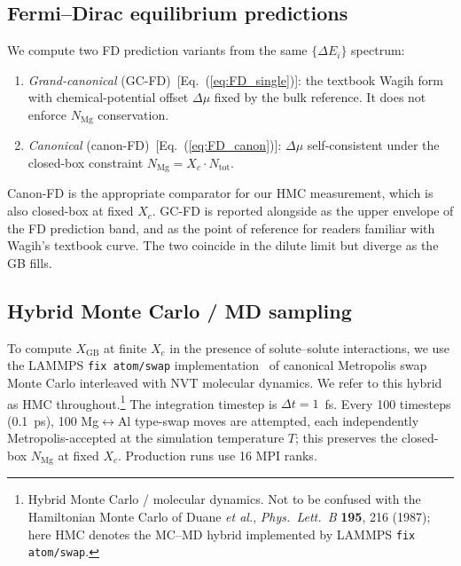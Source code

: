\subsection{Fermi--Dirac equilibrium predictions}\label{sec:meth:FD}

We compute two FD prediction variants from the same $\{\Delta E_i\}$
spectrum:
\begin{enumerate}\itemsep0pt
    \item \emph{Grand-canonical} (GC-FD)~[Eq.~(\ref{eq:FD_single})]: the
        textbook Wagih form with chemical-potential offset $\Delta\mu$
        fixed by the bulk reference. It does not enforce $N_\mathrm{Mg}$
        conservation.
    \item \emph{Canonical} (canon-FD)~[Eq.~(\ref{eq:FD_canon})]:
        $\Delta\mu$ self-consistent under the closed-box constraint
        $N_\mathrm{Mg} = X_c \cdot N_\mathrm{tot}$.
\end{enumerate}
Canon-FD is the appropriate comparator for our HMC measurement, which is
also closed-box at fixed $X_c$. GC-FD is reported alongside as the
upper envelope of the FD prediction band, and as the point of reference
for readers familiar with Wagih's textbook curve. The two coincide in
the dilute limit but diverge as the GB fills.


\subsection{Hybrid Monte Carlo / MD sampling}\label{sec:meth:HMC}

To compute $X_\mathrm{GB}$ at finite $X_c$ in the presence of
solute--solute interactions, we use the LAMMPS \texttt{fix atom/swap}
implementation~\cite{Sadigh2012} of canonical Metropolis swap Monte
Carlo interleaved with NVT molecular dynamics. We refer to this
hybrid as HMC throughout.\footnote{Hybrid Monte Carlo / molecular
dynamics. Not to be confused with the Hamiltonian Monte Carlo of Duane
\emph{et al.}, \emph{Phys.~Lett.~B} \textbf{195}, 216 (1987); here HMC
denotes the MC--MD hybrid implemented by LAMMPS \texttt{fix atom/swap}.}
The integration timestep is $\Delta t = 1$~fs. Every 100 timesteps
(0.1~ps), 100 Mg$\leftrightarrow$Al type-swap moves are attempted,
each independently Metropolis-accepted at the simulation temperature
$T$; this preserves the closed-box $N_\mathrm{Mg}$ at fixed $X_c$.
Production runs use 16 MPI ranks.

